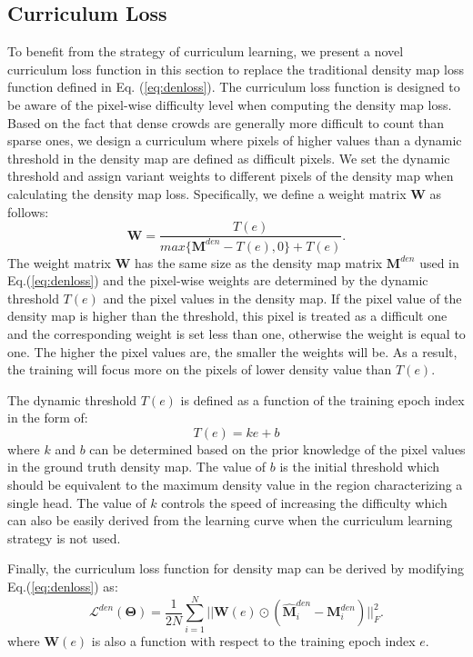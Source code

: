 \documentclass[journal,comsoc]{IEEEtran}
\begin{document}
\subsection{Curriculum Loss} \label{sec:cl}
To benefit from the strategy of curriculum learning, we present a novel curriculum loss function in this section to replace the traditional density map loss function defined in Eq. (\ref{eq:denloss}). The curriculum loss function is designed to be aware of the pixel-wise difficulty level when computing the density map loss. Based on the fact that dense crowds are generally more difficult to count than sparse ones, we design a curriculum where pixels of higher values than a dynamic threshold in the density map are defined as difficult pixels. We set the dynamic threshold and assign variant weights to different pixels of the density map when calculating the density map loss. Specifically, we define a weight matrix $\bm{W}$ as follows:
\begin{equation}
    \label{eq:weight}
    \bm{W} = \frac{T(e)}{max\{\bm{M}^{den}-T(e),0\}+T(e)}.
\end{equation}
The weight matrix $\bm{W}$ has the same size as the density map matrix $\bm{M}^{den}$ used in Eq.(\ref{eq:denloss}) and the pixel-wise weights are determined by the dynamic threshold $T(e)$ and the pixel values in the density map. 
If the pixel value of the density map is higher than the threshold, this pixel is treated as a difficult one and the corresponding weight is set less than one, otherwise the weight is equal to one. The higher the pixel values are, the smaller the weights will be. As a result, the training will focus more on the pixels of lower density value than $T(e)$.

The dynamic threshold $T(e)$ is defined as a function of the training epoch index in the form of:
\begin{equation}
    \label{eq:threshold}
    T(e) = k e + b
\end{equation}
where $k$ and $b$ can be determined based on the prior knowledge of the pixel values in the ground truth density map. The value of $b$ is the initial threshold which should be equivalent to the maximum density value in the region characterizing a single head. The value of $k$ controls the speed of increasing the difficulty which can also be easily derived from the learning curve when the curriculum learning strategy is not used.

Finally, the curriculum loss function for density map can be derived by modifying Eq.(\ref{eq:denloss}) as:
\begin{equation}
    \label{eq:weightdenloss}
    \mathcal{L}^{den}(\bm{\Theta}) = \frac{1}{2N} \sum_{i=1}^N ||\bm{W}(e)\odot (\hat{\bm{M}}_i^{den} - \bm{M}^{den}_i)||_F^2.
\end{equation}
where $\bm{W}(e)$ is also a function with respect to the training epoch index $e$.
\end{document}
